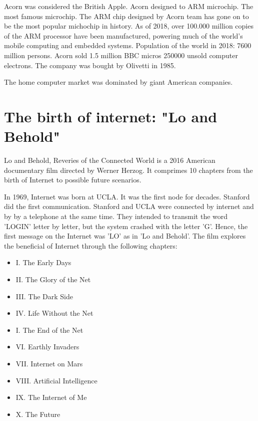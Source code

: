     
    
 Acorn was considered the British Apple.    
 Acorn designed to ARM microchip. The most famous microchip.
 The ARM chip designed by Acorn team has gone on to be the most popular michochip in history.  
 As of 2018, over 100.000 million copies of the ARM processor have been manufactured, powering much of the world's mobile computing and 
 embedded systems. Population of the world in 2018: 7600 million persons. 
 Acorn sold 1.5 million BBC micros 
 250000 unsold computer electrons.     
 The company was bought by Olivetti in 1985. 
      
    
 The home computer market was dominated by giant American companies. 
       
  
 
    
   
    
\section*{The birth of internet: "Lo and Behold"} 
 Lo and Behold, Reveries of the Connected World is a 2016 American documentary film 
 directed by Werner Herzog. It comprimes 10 chapters from the birth of Internet to possible future 
 scenarios. 
 
 In 1969, Internet was born at UCLA.   
 It was the first node for decades. 
 Stanford did the first communication. 
 Stanford and UCLA were connected by internet and by by a telephone at the same time.  
 They intended to transmit the word 'LOGIN' letter by letter,  
 but the system crashed with the letter 'G'. 
 Hence, the first message on the Internet was 'LO' as in 'Lo and Behold'.    
 The film explores the beneficial of  Internet through the following chapters: 
 \begin{itemize} 
 \setlength\itemsep{0cm}
 \item I. The Early Days
 \item II.  The Glory of the Net
 \item III. The Dark Side
 \item IV. Life Without the Net
 \item I. The End of the Net
 \item VI.  Earthly Invaders
 \item VII.  Internet on Mars
 \item VIII.  Artificial Intelligence
 \item IX. The Internet of Me
 \item X. The Future
 \end{itemize} 
 
